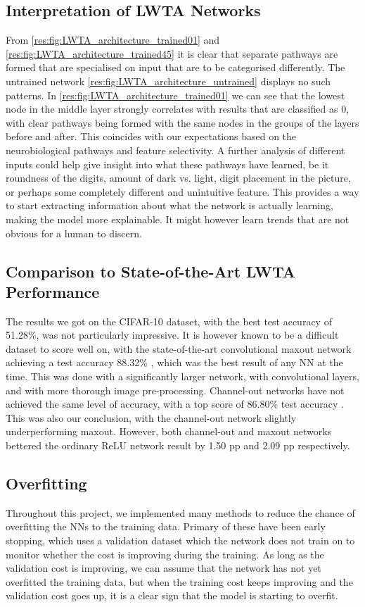 
\subsection{Interpretation of LWTA Networks}
    From \cref{res:fig:LWTA_architecture_trained01} and \cref{res:fig:LWTA_architecture_trained45} it is clear that separate pathways are formed that are specialised on input that are to be categorised differently. The untrained network \cref{res:fig:LWTA_architecture_untrained} displays no such patterns. In \cref{res:fig:LWTA_architecture_trained01} we can see that the lowest node in the middle layer strongly correlates with results that are classified as 0, with clear pathways being formed with the same nodes in the groups of the layers before and after. This coincides with our expectations based on the neurobiological pathways and feature selectivity. A further analysis of different inputs could help give insight into what these pathways have learned, be it roundness of the digits, amount of dark vs. light, digit placement in the picture, or perhaps some completely different and unintuitive feature. This provides a way to start extracting information about what the network is actually learning, making the model more explainable. It might however learn trends that are not obvious for a human to discern. 

\subsection{Comparison to State-of-the-Art LWTA Performance}

    The results we got on the CIFAR-10 dataset, with the best test accuracy of 51.28\%, was not particularly impressive. It is however known to be a difficult dataset to score well on, with the state-of-the-art convolutional maxout network achieving a test accuracy 88.32\% \citep{Maxout_Networks}, which was the best result of any NN at the time. This was done with a significantly larger network, with convolutional layers, and with more thorough image pre-processing. Channel-out networks have not achieved the same level of accuracy, with a top score of 86.80\% test accuracy \citep{Wang}. This was also our conclusion, with the channel-out network slightly underperforming maxout. However, both channel-out and maxout networks bettered the ordinary ReLU network result by 1.50 pp and 2.09 pp respectively. 

\subsection{Overfitting}
    Throughout this project, we implemented many methods to reduce the chance of overfitting the NNs to the training data. Primary of these have been early stopping, which uses a validation dataset which the network does not train on to monitor whether the cost is improving during the training. As long as the validation cost is improving, we can assume that the network has not yet overfitted the training data, but when the training cost keeps improving and the validation cost goes up, it is a clear sign that the model is starting to overfit.

